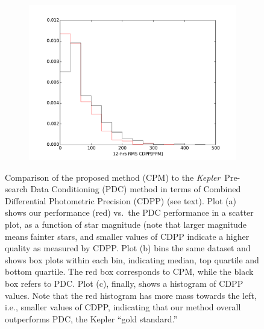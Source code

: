 \documentclass[12pt, preprint]{aastex}
\newcommand{\project}[1]{\textsl{#1}}
\newcommand{\Kepler}{\project{Kepler}}
\newcommand{\name}{CPM}
\begin{document}
\begin{figure}[htb]
\begin{subfigure}[htb]{0.33\columnwidth}
\includegraphics[width=\columnwidth]{pdc_cdpp12_hist_r100}
\caption{}
\end{subfigure}
\caption{\label{cdpp} Comparison of the proposed method (\name) to the \Kepler\ Pre-search Data Conditioning (PDC) method 
in terms of Combined Differential Photometric Precision (CDPP) (see text). 
Plot (a) shows our performance (red) vs.\ the PDC performance in a scatter plot, as a function of star magnitude 
(note that larger magnitude means fainter stars, and smaller values of CDPP indicate a higher quality as measured by CDPP.  
Plot (b) bins the same dataset and shows box plots within each bin, indicating median, top quartile and bottom quartile. 
The red box corresponds to \name, while the black box refers to PDC. Plot (c), finally, shows a histogram of CDPP values. 
Note that the red histogram has more mass towards the left, i.e., smaller values of CDPP, indicating that our method overall outperforms PDC, the Kepler ``gold standard.'' 
}
\end{figure}

\clearpage
\end{document}
